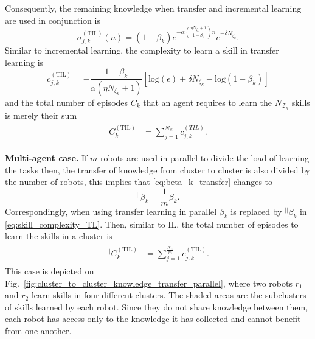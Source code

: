 Consequently, the remaining knowledge when transfer and incremental learning are used in conjunction is
\begin{equation}\label{eq:remaining_knowledge__ITL}
	\bar{\sigma}^{(\text{TIL})}_{j,k}(n) = \left(1- \beta_k\right) e^{-\alpha  \left(\frac{ \eta N_{\zeta_k}+1}{1 - \beta_k}\right) n} e^{-\delta N_{\zeta_k}}.
\end{equation}
Similar to incremental learning, the complexity to learn a skill in transfer learning is
\begin{equation}\label{eq:skill_complexity_TL}
	c^{(\text{TIL})}_{j,k} = -\frac{1 - \beta_{k}}{\alpha (\eta N_{\zeta_k}+ 1)}\left[\text{log}(\epsilon) + \delta N_{\zeta_k} - \text{log}(1 - \beta_{k})\right]
\end{equation}
and the total number of episodes  $ C_k $ that an agent requires to learn the $N_{\mathcal{Z}_k}$ skills is merely their sum
\begin{align}\label{eq:total_episodes_transfer}
	\begin{split}
		C^{(\text{TIL})}_k &= \sum^{N_{\mathcal{Z}}}_{j=1} c^{(TIL)}_{j,k}.
	\end{split}
\end{align}

\textbf{Multi-agent case.} If $m$ robots are used in parallel to divide the load of learning the tasks then, the transfer of knowledge from cluster to cluster is also divided by the number of robots, this implies that \eqref{eq:beta_k_transfer} changes to
\begin{equation}\label{eq:beta_k_transfer_parallel}
	{}^{\lvert \rvert}\beta_{k}= \frac{1}{m}\beta_{k}.
\end{equation}
Correspondingly, when using transfer learning in parallel $\beta_k$ is replaced by ${}^{\lvert \rvert}\beta_{k}$ in \eqref{eq:skill_complexity_TL}. Then, similar to IL, the total number of episodes to learn the skills in a cluster is
\begin{align}
	\begin{split}
		{}^{\lvert \rvert}C^{(\text{TIL})}_k &= \sum^{\frac{N_{\mathcal{Z}}}{m}}_{j=1} c^{(\text{TIL})}_{j,k}.
	\end{split}
\end{align}
This case is depicted on Fig.~\ref{fig:cluster_to_cluster_knowledge_transfer_parallel}, where two robots $ r_1$ and $r_2$ learn skills in four different clusters. The shaded areas are the subclusters of skills learned by each robot. Since they do not share knowledge between them, each robot has access only to the knowledge it has collected and cannot benefit from one another. 

